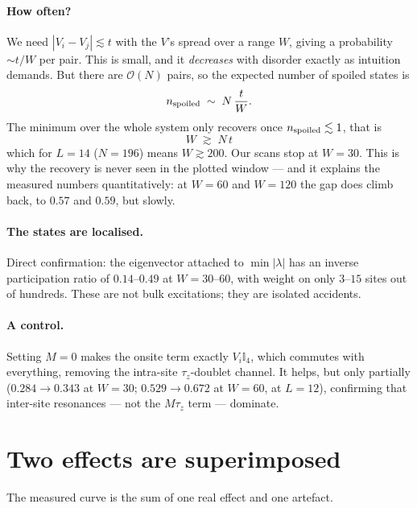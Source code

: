 \documentclass[11pt,a4paper]{article}
\begin{document}
\paragraph{How often?} We need $|V_i - V_j| \lesssim t$ with the $V$'s spread
over a range $W$, giving a probability $\sim t/W$ per pair. This is small, and
it \emph{decreases} with disorder exactly as intuition demands. But there are
$\mathcal{O}(N)$ pairs, so the expected number of spoiled states is
\begin{equation}
  n_{\rm spoiled} \;\sim\; N\,\frac{t}{W} .
  \label{eq:counting}
\end{equation}
The minimum over the whole system only recovers once $n_{\rm spoiled}\lesssim1$,
that is
\begin{equation}
  \boxed{\;W \;\gtrsim\; N\,t\;}
\end{equation}
which for $L=14$ ($N=196$) means $W\gtrsim200$. Our scans stop at $W=30$. This
is why the recovery is never seen in the plotted window --- and it explains the
measured numbers quantitatively: at $W=60$ and $W=120$ the gap does climb back,
to $0.57$ and $0.59$, but slowly.

\paragraph{The states are localised.} Direct confirmation: the eigenvector
attached to $\min|\lambda|$ has an inverse participation ratio of
$0.14$--$0.49$ at $W=30$--$60$, with weight on only $3$--$15$ sites out of
hundreds. These are not bulk excitations; they are isolated accidents.

\paragraph{A control.} Setting $M=0$ makes the onsite term exactly
$V_i\mathbb{I}_4$, which commutes with everything, removing the intra-site
$\tau_z$-doublet channel. It helps, but only partially
($0.284 \to 0.343$ at $W=30$; $0.529\to0.672$ at $W=60$, at $L=12$), confirming
that inter-site resonances --- not the $M\tau_z$ term --- dominate.

\section{Two effects are superimposed}

The measured curve is the sum of one real effect and one artefact.
\end{document}
